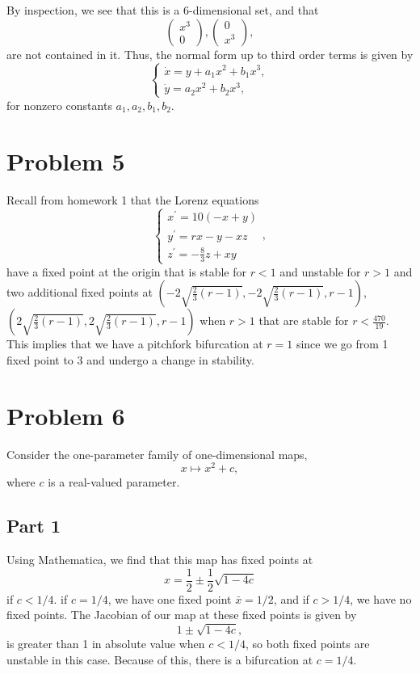 \documentclass{article}
\begin{document}
By inspection, we see that this is a 6-dimensional set, and that 
\[
\begin{pmatrix}
x^3\\0
\end{pmatrix},\begin{pmatrix}
0\\x^3
\end{pmatrix},
\]
are not contained in it. Thus, the normal form up to third order terms is given by
\[
\begin{cases}
	\dot x=y+a_1x^2+b_1x^3,\\
	\dot y=a_2x^2+b_2x^3,
\end{cases}
\]
for nonzero constants $a_1,a_2,b_1,b_2$.

\section{Problem 5}
Recall from homework 1 that the 
Lorenz equations
\begin{equation*}
	\left\{\begin{array}{l}
		x^{\prime}=10(-x+y) \\
		y^{\prime}=r x-y-x z \\
		z^{\prime}=-\frac{8}{3} z+x y
	\end{array}\right.,
\end{equation*}
have a fixed point at the origin that is stable for $r<1$ and unstable for $r>1$ and two additional fixed points at $\left(-2\sqrt{\frac{2}{3}(r-1)},-2\sqrt{\frac{2}{3}(r-1)},r-1\right)$, $\left(2\sqrt{\frac{2}{3}(r-1)},2\sqrt{\frac{2}{3}(r-1)},r-1\right)$ when $r>1$ that are stable for $r<\frac{470}{19}$. This implies that we have a pitchfork bifurcation at $r=1$ since we go from 1 fixed point to 3 and undergo a change in stability.

\section{Problem 6}
Consider the one-parameter family of one-dimensional maps,
\begin{equation*}
	x \mapsto x^2 + c,
\end{equation*}
where $c$ is a real-valued parameter.

\subsection{Part 1}
Using Mathematica, we find that this map has fixed points at
\[
x=\frac{1}{2}\pm\frac{1}{2}\sqrt{1-4c}
\]
if $c<1/4$. if $c=1/4$, we have one fixed point $\bar x=1/2$, and if $c>1/4$, we have no fixed points. The Jacobian of our map at these fixed points is given by
\[
1\pm\sqrt{1-4c},
\]
is greater than 1 in absolute value when $c<1/4$, so both fixed points are unstable in this case. Because of this, there is a bifurcation at $c=1/4$.
\end{document}
